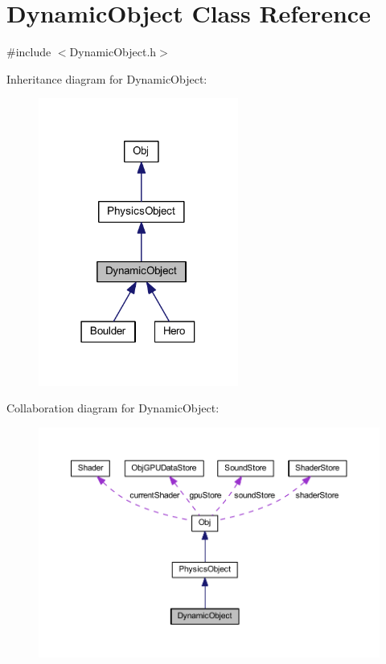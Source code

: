 \hypertarget{class_dynamic_object}{}\section{Dynamic\+Object Class Reference}
\label{class_dynamic_object}


{\ttfamily \#include $<$Dynamic\+Object.\+h$>$}



Inheritance diagram for Dynamic\+Object\+:
\nopagebreak
\begin{figure}[H]
\begin{center}
\leavevmode
\includegraphics[width=186pt]{class_dynamic_object__inherit__graph}
\end{center}
\end{figure}


Collaboration diagram for Dynamic\+Object\+:
\nopagebreak
\begin{figure}[H]
\begin{center}
\leavevmode
\includegraphics[width=350pt]{class_dynamic_object__coll__graph}
\end{center}
\end{figure}
